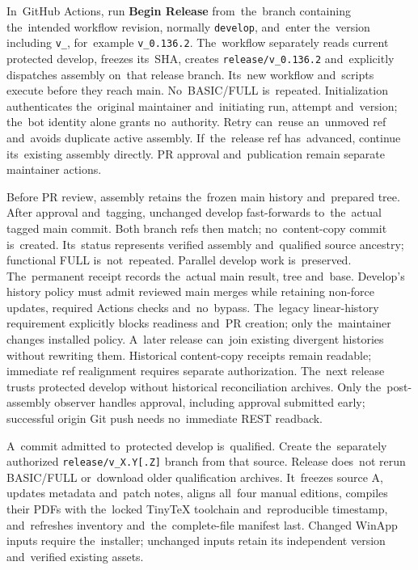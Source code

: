 \documentclass[11pt,a4paper]{article}
\newcommand{\ui}[1]{\textbf{#1}}
\newcommand{\codeword}[1]{\nolinkurl{#1}}
\begin{document}
In~GitHub Actions, run \ui{Begin Release} from~the~branch containing
the~intended workflow revision, normally \codeword{develop}, and~enter
the~version including \codeword{v_}, for~example \codeword{v_0.136.2}.
The~workflow separately reads current protected develop, freezes its~SHA,
creates \codeword{release/v_0.136.2} and~explicitly dispatches assembly
on~that release branch. Its~new workflow and~scripts execute before they
reach main. No~BASIC/FULL is~repeated. Initialization authenticates
the~original maintainer and~initiating run, attempt and~version;
the~bot identity alone grants no~authority. Retry can~reuse an~unmoved ref
and~avoids duplicate active assembly. If~the~release ref has~advanced,
continue its~existing assembly directly. PR approval and~publication remain
separate maintainer actions.

Before PR review, assembly retains the~frozen main history and~prepared tree.
After approval and~tagging, unchanged develop fast-forwards to~the~actual tagged
main commit. Both branch refs then match; no~content-copy commit is~created.
Its~status represents verified assembly and~qualified source ancestry;
functional FULL is~not~repeated. Parallel develop work is~preserved.
The~permanent receipt records the~actual main result, tree and~base.
Develop's history policy must admit reviewed main merges while retaining
non-force updates, required Actions checks and~no~bypass. The~legacy
linear-history requirement explicitly blocks readiness and~PR creation;
only the~maintainer changes installed policy. A~later release can~join existing
divergent histories without rewriting them. Historical content-copy receipts
remain readable; immediate ref realignment requires separate authorization.
The~next release trusts protected develop without historical reconciliation
archives. Only the~post-assembly observer handles approval, including approval
submitted early; successful origin Git push needs no~immediate REST readback.

A~commit admitted to~protected develop is~qualified. Create the~separately
authorized \codeword{release/v_X.Y[.Z]} branch from that source.
Release does~not rerun BASIC/FULL or~download older qualification archives.
It~freezes source A, updates metadata and~patch notes, aligns all~four manual
editions, compiles their PDFs with the~locked TinyTeX toolchain and~reproducible
timestamp, and~refreshes inventory and~the~complete-file manifest last.
Changed WinApp inputs require the~installer; unchanged inputs retain its
independent version and~verified existing assets.
\end{document}
